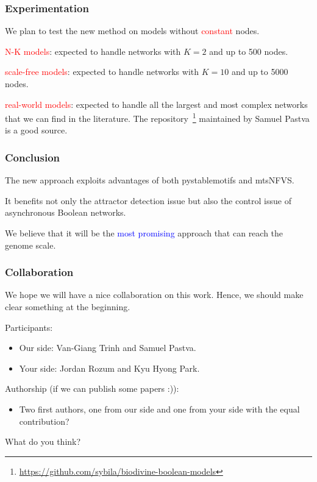 \documentclass{beamer}              %
\newcommand{\blue}[1]{\textcolor{blue}{#1}}
\newcommand{\red}[1]{\textcolor{red}{#1}}
\begin{document}
\begin{frame}
\frametitle{Experimentation}

We plan to test the new method on models without \red{constant} nodes.

\hspace{0.8cm}

\red{N-K models}: expected to handle networks with \(K = 2\) and up to 500 nodes.

\hspace{0.8cm}

\red{scale-free models}: expected to handle networks with \(K = 10\) and up to 5000 nodes.

\hspace{0.8cm}

\red{real-world models}: expected to handle all the largest and most complex networks that we can find in the literature. The repository~\footnote{\url{https://github.com/sybila/biodivine-boolean-models}} maintained by Samuel Pastva is a good source.

\end{frame}

\begin{frame}
\frametitle{Conclusion}

The new approach exploits advantages of both pystablemotifs and mtsNFVS.

\hspace{0.8cm}

It benefits not only the attractor detection issue but also the control issue of asynchronous Boolean networks.

\hspace{0.8cm}

We believe that it will be the \blue{most promising} approach that can reach the genome scale.

\end{frame}

\begin{frame}
\frametitle{Collaboration}

We hope we will have a nice collaboration on this work.
Hence, we should make clear something at the beginning.

\hspace{0.8cm}

Participants:
\begin{itemize}
  \item Our side: Van-Giang Trinh and Samuel Pastva.
  \item Your side: Jordan Rozum and Kyu Hyong Park.
\end{itemize}

\hspace{0.8cm}

Authorship (if we can publish some papers :)): 
\begin{itemize}
  \item Two first authors, one from our side and one from your side with the equal contribution?
\end{itemize}

\hspace{0.8cm}

What do you think?

\end{frame}
\end{document}
